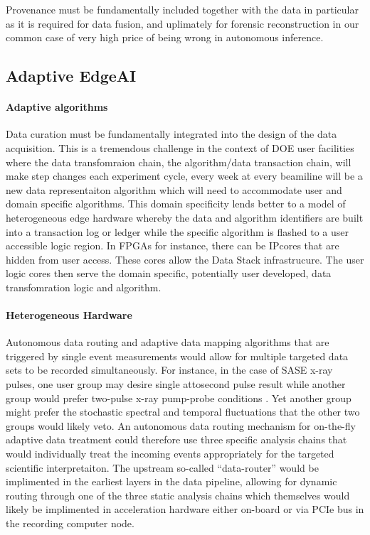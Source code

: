 \documentclass{article}
\begin{document}
Provenance must be fundamentally included together with the data in particular as it is required for data fusion, and uplimately for forensic reconstruction in our common case of very high price of being wrong in autonomous inference.




\subsection{Adaptive EdgeAI}
\paragraph{Adaptive algorithms}
Data curation must be fundamentally integrated into the design of the data acquisition.  This is a tremendous challenge in the context of DOE user facilities where the data transfomraion chain, the algorithm/data transaction chain, will make step changes each experiment cycle, every week at every beamiline will be a new data representaiton algorithm which will need to accommodate user and domain specific algorithms.
This domain specificity lends better to a model of heterogeneous edge hardware whereby the data and algorithm identifiers are built into a transaction log or ledger while the specific algorithm is flashed to a user accessible logic region.
In FPGAs for instance, there can be IPcores that are hidden from user access.  These cores allow the Data Stack infrastrucure.  The user logic cores then serve the domain specific, potentially user developed, data transfomration logic and algorithm.

\paragraph{Heterogeneous Hardware}
Autonomous data routing and adaptive data mapping algorithms that are triggered by single event measurements \cite{Lutman2016,Wolfi2017_review,Hartmann2018} would allow for multiple targeted data sets to be recorded simultaneously.  
For instance, in the case of SASE x-ray pulses, one user group may desire single attosecond pulse \cite{Cryan2016_impulsive} result while another group would prefer two-pulse x-ray pump-probe conditions \cite{Hartmann2018}.  
Yet another group might prefer the stochastic spectral and temporal fluctuations \cite{Feurer2018,IanRobinson2018,Driver2019_spooktroscopy} that the other two groups would likely veto.  
An autonomous data routing mechanism for on-the-fly adaptive data treatment could therefore use three specific analysis chains that would individually treat the incoming events appropriately for the targeted scientific interpretaiton.
The upstream so-called ``data-router'' \cite{Audrey} would be implimented in the earliest layers in the data pipeline, allowing for dynamic routing through one of the three static analysis chains which themselves would likely be implimented in acceleration hardware either on-board or via PCIe bus in the recording computer node.
\end{document}
